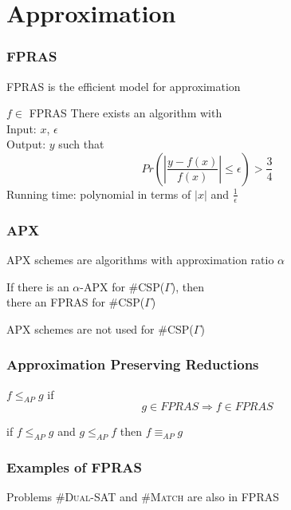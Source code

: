 \documentclass[a4paper,handout]{beamer}
\newcommand{\pname}[1]{\textsc{#1}}
\newcommand{\ccsp}{\#CSP}
\newcommand{\aple}{\le_{AP}}
\newcommand{\apeq}{\equiv_{AP}}
\newcommand{\oneoeps}{\frac{1}{\epsilon}}
\newcommand{\eps}{\epsilon}
\theoremstyle{definition}
\begin{document}
\section{Approximation}

\begin{frame}
\frametitle{FPRAS}
FPRAS is the efficient model for approximation
\begin{block} {\(f \in \) FPRAS}
There exists an algorithm with\\
Input: \(x\), \(\eps\) \\
Output: \(y\) such that 
\[Pr\left(\left|\frac{y-f(x)}{f(x)}\right| \le \eps\right) > \frac{3}{4}\]
Running time: polynomial in terms of \(|x|\) and \(\oneoeps\)
\end{block}
\end{frame}

\begin{frame}
\frametitle{APX}
APX schemes are algorithms with approximation ratio \(\alpha\) \\
\vskip 12pt
\pause
\begin{theorem}
If there is an \(\alpha\)-APX for \ccsp(\(\Gamma\)), then\\
there an FPRAS for \ccsp(\(\Gamma\))
\end{theorem}
\vskip 12pt
APX schemes are not used for \ccsp(\(\Gamma\))
\end{frame}

\begin{frame}
\frametitle{Approximation Preserving Reductions}
\begin{definition}[AP-reduction]
\(f \aple g\) if \\
\[g \in FPRAS \Rightarrow f \in FPRAS\]
\end{definition}
\pause
\vskip 12pt
if \(f \aple g\) and \(g \aple f\) then \(f \apeq g\)
\end{frame}

\begin{frame}
\frametitle{Examples of FPRAS}
\begin{center}
\end{center}

\pause
Problems \pname{\#Dual-SAT} and \pname{\#Match} are also in FPRAS
\end{frame}
\end{document}
